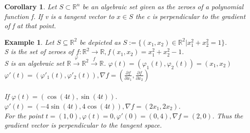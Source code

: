 \documentclass{article}
\newtheorem{example}{Example}
\newtheorem{corollary}{Corollary}
\begin{document}
\begin{corollary}
  Let $S \subset \mathbb{R}^n$ be an algebraic set given as the zeroes of a polynomial function f. If v is a tangent vector to $x \in S$ the c is perpendicular to the gradient of f at that point.
\end{corollary}
\begin{example}
  Let $S \subseteq \mathbb{R}^2$ be depicted as $S := \{ (x_1, x_2) \in \mathbb{R}^2 \vert x_1^2 + x_2^2 = 1 \}$. 
  \\
  S is the set of zeroes of $f : \mathbb{R}^2 \to \mathbb{R}, f(x_1, x_2) = x_1^2 + x_2^2 - 1$.
  \\
  S is an algebraic set $\mathbb{R} \overset{\varphi}{\to} \mathbb{R}^2 \overset{f}{\to} \mathbb{R}$. $\varphi(t) = (\varphi_1(t), \varphi_2(t)) = (x_1, x_2)$
  \\
  $\varphi'(t) = (\varphi'_1(t), \varphi'_2(t)), \nabla f = (\frac{\partial f}{\partial x_1}, \frac{\partial f}{\partial x_2})$
  \\\\
  If $\varphi(t) = (\cos(4t), \sin(4t))$. $\varphi'(t) = (-4\sin(4t), 4\cos(4t)), \nabla f = (2x_1, 2x_2)$.
  \\
  For the point $t = (1, 0), \varphi(t) = 0, \varphi'(0) = (0, 4), \nabla f = (2, 0)$. Thus the gradient vector is perpendicular to the tangent space.
\end{example}
\newpage
\end{document}
